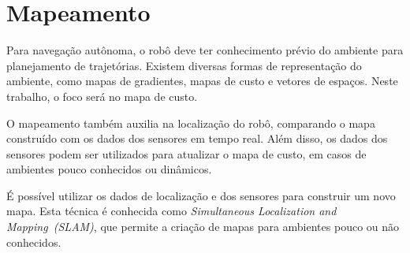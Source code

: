 \documentclass[repeatfields,xlists,xpacks,oneside,yearsonly]{ufrgscca}
\begin{document}




\section{Mapeamento}

Para navegação autônoma, o robô deve ter conhecimento prévio do
ambiente para planejamento de trajetórias. Existem diversas formas de
representação do ambiente, como mapas de gradientes, mapas de custo e
vetores de espaços. Neste trabalho, o foco será no mapa de custo.

O mapeamento também auxilia na localização do robô, comparando o mapa
construído com os dados dos sensores em tempo real. Além disso, os
dados dos sensores podem ser utilizados para atualizar o mapa de
custo, em casos de ambientes pouco conhecidos ou dinâmicos.

É possível utilizar os dados de localização e dos sensores para construir um novo mapa.
Esta técnica é conhecida como \textit{Simultaneous Localization and Mapping~(SLAM)},
que permite a criação de mapas para ambientes pouco ou não conhecidos.
\end{document}
